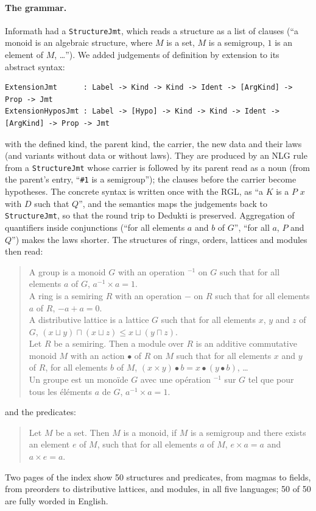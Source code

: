 \documentclass{easychair}
\newcommand{\ttt}[1]{\texttt{#1}}
\newcommand{\reading}[1]{\begin{quote}\small #1\end{quote}}
\begin{document}
\paragraph{The grammar.} Informath had a \ttt{StructureJmt}, which reads a structure as a list of
clauses (``a monoid is an algebraic structure, where $M$ is a set, $M$ is a semigroup,
$1$ is an element of $M$, \ldots''). We added judgements of definition by extension to its
abstract syntax:
\begin{lstlisting}
ExtensionJmt      : Label -> Kind -> Kind -> Ident -> [ArgKind] -> Prop -> Jmt
ExtensionHyposJmt : Label -> [Hypo] -> Kind -> Kind -> Ident -> [ArgKind] -> Prop -> Jmt
\end{lstlisting}
with the defined kind, the parent kind, the carrier, the new data and their laws (and variants
without data or without laws). They are produced by an NLG rule from a \ttt{StructureJmt} whose
carrier is followed by its parent read as a noun (from the parent's entry, ``\ttt{\#1} is a
semigroup''); the clauses before the carrier become hypotheses. The concrete syntax is written
once with the RGL, as ``a $K$ is a $P$ $x$ with $D$ such that $Q$'', and the semantics maps
the judgements back to \ttt{StructureJmt}, so that the round trip to Dedukti is preserved.
Aggregation of quantifiers inside conjunctions (``for all elements $a$ and $b$ of $G$'',
``for all $a$, $P$ and $Q$'') makes the laws shorter. The structures of rings, orders, lattices
and modules then read:
\reading{A group is a monoid $G$ with an operation ${}^{-1}$ on $G$ such that for all elements
$a$ of $G$, $a^{-1} \times a = 1$.\\
A ring is a semiring $R$ with an operation $-$ on $R$ such that for all elements $a$ of $R$,
$-a + a = 0$.\\
A distributive lattice is a lattice $G$ such that for all elements $x$, $y$ and $z$ of $G$,
$(x \sqcup y) \sqcap (x \sqcup z) \leq x \sqcup (y \sqcap z)$.\\
Let $R$ be a semiring. Then a module over $R$ is an additive commutative monoid $M$ with an
action $\bullet$ of $R$ on $M$ such that for all elements $x$ and $y$ of $R$, for all elements
$b$ of $M$, $(x \times y) \bullet b = x \bullet (y \bullet b)$, \ldots\\
Un groupe est un monoïde $G$ avec une opération ${}^{-1}$ sur $G$ tel que pour tous les
éléments $a$ de $G$, $a^{-1} \times a = 1$.}
\noindent and the predicates:
\reading{Let $M$ be a set. Then $M$ is a monoid, if $M$ is a semigroup and there exists an
element $e$ of $M$, such that for all elements $a$ of $M$, $e \times a = a$ and $a \times e =
a$.}
\noindent Two pages of the index show 50 structures and predicates, from magmas to fields, from
preorders to distributive lattices, and modules, in all five languages; 50 of 50 are fully
worded in English.
\end{document}
